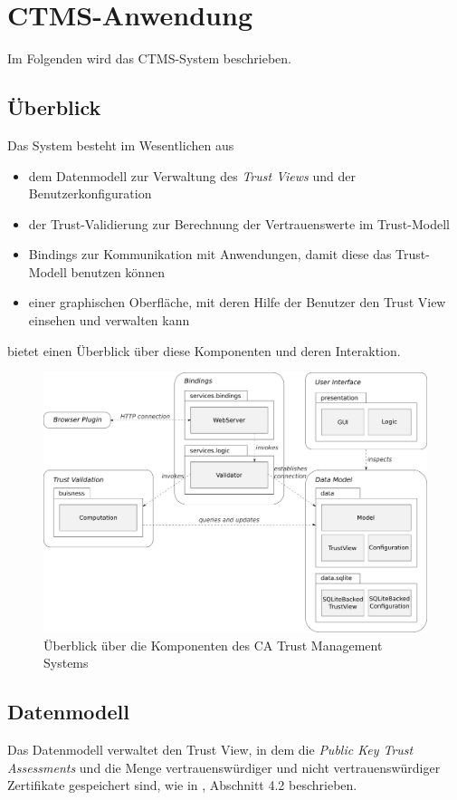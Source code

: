 \documentclass[accentcolor=tud1c,article,colorback,11pt]{tudreport}
\begin{document}
\section{CTMS-Anwendung}

Im Folgenden wird das CTMS-System beschrieben.

\subsection{Überblick}
Das System besteht im Wesentlichen aus
\begin{itemize}
\item dem Datenmodell zur Verwaltung des \textit{Trust Views} und der Benutzerkonfiguration
\item der Trust-Validierung zur Berechnung der Vertrauenswerte im Trust-Modell
\item Bindings zur Kommunikation mit Anwendungen, damit diese das Trust-Modell benutzen können
\item einer graphischen Oberfläche, mit deren Hilfe der Benutzer den Trust View  einsehen und verwalten kann
\end{itemize}
 bietet einen Überblick über diese Komponenten und deren Interaktion.

\begin{figure}[h]
  \centering
  \includegraphics[width=\textwidth]{overview}
  \caption{Überblick über die Komponenten des CA Trust Management Systems}
  \label{overview}
\end{figure}

\subsection{Datenmodell}
Das Datenmodell verwaltet den Trust View, in dem die \textit{Public Key Trust Assessments} und die Menge vertrauenswürdiger und nicht vertrauenswürdiger Zertifikate gespeichert sind, wie in \cite{braun2013trust}, Abschnitt 4.2 beschrieben.
\end{document}
